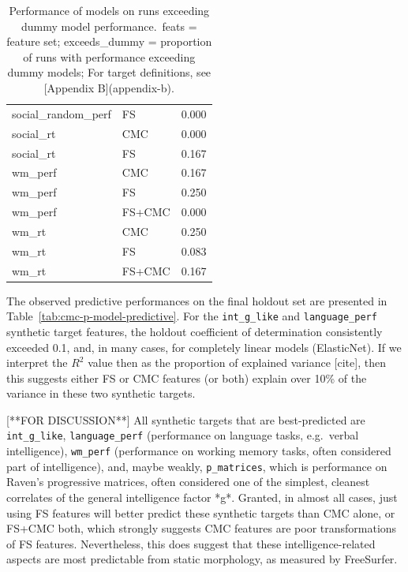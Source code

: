 \documentclass{article}
\begin{document}
\begin{table}
\begin{tabular}{llr}
	social\_random\_perf & FS & 0.000 \\
	social\_rt & CMC & 0.000 \\
	social\_rt & FS & 0.167 \\
	wm\_perf & CMC & 0.167 \\
	wm\_perf & FS & 0.250 \\
	wm\_perf & FS+CMC & 0.000 \\
	wm\_rt & CMC & 0.250 \\
	wm\_rt & FS & 0.083 \\
	wm\_rt & FS+CMC & 0.167 \\
	\bottomrule
\end{tabular}
\footnotesize
\caption{%
Performance of models on runs exceeding dummy model performance.\
feats = feature set;
exceeds\_dummy = proportion of runs with performance exceeding dummy models;
For target definitions, see [Appendix B](appendix-b).
}
\normalsize
\label{tab:cmc-p-predictive}
\end{table}



The observed predictive performances on the final holdout set are presented
in Table~\ref{tab:cmc-p-model-predictive}. For the \texttt{int\_g\_like} and
\texttt{language\_perf} synthetic target features, the holdout coefficient of
determination consistently exceeded 0.1, and, in many cases, for completely
linear models (ElasticNet). If we interpret the \(R^2\) value then as the
proportion of explained variance [cite], then this suggests either FS or CMC
features (or both) explain over 10\% of the variance in these two synthetic
targets.

%

[**FOR DISCUSSION**] All synthetic targets that are best-predicted are
\texttt{int\_g\_like}, \texttt{language\_perf} (performance on language
tasks, e.g.\ verbal intelligence), \texttt{wm\_perf} (performance on working
memory tasks, often considered part of intelligence), and, maybe weakly,
\texttt{p\_matrices}, which is performance on Raven's progressive matrices,
often considered one of the simplest, cleanest correlates of the general
intelligence factor *g*. Granted, in almost all cases, just using FS features
will better predict these synthetic targets than CMC alone, or FS+CMC both,
which strongly suggests CMC features are poor transformations of FS features.
Nevertheless, this does suggest that these intelligence-related aspects are
most predictable from static morphology, as measured by FreeSurfer.
\end{document}
